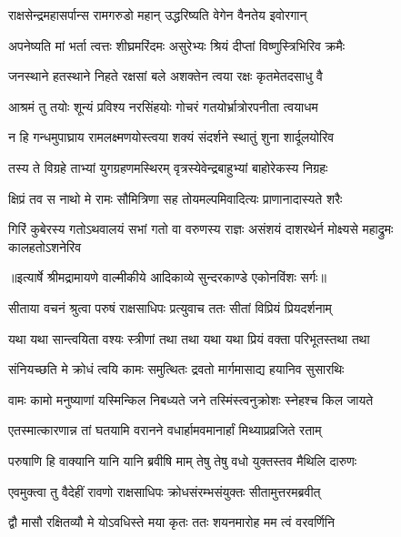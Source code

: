 \twolineshloka
{राक्षसेन्द्रमहासर्पान्स रामगरुडो महान्}
{उद्धरिष्यति वेगेन वैनतेय इवोरगान्} %

\twolineshloka
{अपनेष्यति मां भर्ता त्वत्तः शीघ्रमरिंदमः}
{असुरेभ्यः श्रियं दीप्तां विष्णुस्त्रिभिरिव क्रमैः} %

\twolineshloka
{जनस्थाने हतस्थाने निहते रक्षसां बले}
{अशक्तेन त्वया रक्षः कृतमेतदसाधु वै} %

\twolineshloka
{आश्रमं तु तयोः शून्यं प्रविश्य नरसिंहयोः}
{गोचरं गतयोर्भ्रात्रोरपनीता त्वयाधम} %

\twolineshloka
{न हि गन्धमुपाघ्राय रामलक्ष्मणयोस्त्वया}
{शक्यं संदर्शने स्थातुं शुना शार्दूलयोरिव} %

\twolineshloka
{तस्य ते विग्रहे ताभ्यां युगग्रहणमस्थिरम्}
{वृत्रस्येवेन्द्रबाहुभ्यां बाहोरेकस्य निग्रहः} %

\twolineshloka
{क्षिप्रं तव स नाथो मे रामः सौमित्रिणा सह}
{तोयमल्पमिवादित्यः प्राणानादास्यते शरैः} %

\fourlineindentedshloka
{गिरिं कुबेरस्य गतोऽथवालयं}
{ सभां गतो वा वरुणस्य राज्ञः}
{असंशयं दाशरथेर्न मोक्ष्यसे}
{ महाद्रुमः कालहतोऽशनेरिव} %


{॥इत्यार्षे श्रीमद्रामायणे वाल्मीकीये आदिकाव्ये सुन्दरकाण्डे एकोनविंशः सर्गः॥}


\twolineshloka
{सीताया वचनं श्रुत्वा परुषं राक्षसाधिपः}
{प्रत्युवाच ततः सीतां विप्रियं प्रियदर्शनाम्} %

\twolineshloka
{यथा यथा सान्त्वयिता वश्यः स्त्रीणां तथा तथा}
{यथा यथा प्रियं वक्ता परिभूतस्तथा तथा} %

\twolineshloka
{संनियच्छति मे क्रोधं त्वयि कामः समुत्थितः}
{द्रवतो मार्गमासाद्य हयानिव सुसारथिः} %

\twolineshloka
{वामः कामो मनुष्याणां यस्मिन्किल निबध्यते}
{जने तस्मिंस्त्वनुक्रोशः स्नेहश्च किल जायते} %

\twolineshloka
{एतस्मात्कारणान्न तां घतयामि वरानने}
{वधार्हामवमानार्हां मिथ्याप्रव्रजिते रताम्} %

\twolineshloka
{परुषाणि हि वाक्यानि यानि यानि ब्रवीषि माम्}
{तेषु तेषु वधो युक्तस्तव मैथिलि दारुणः} %

\twolineshloka
{एवमुक्त्वा तु वैदेहीं रावणो राक्षसाधिपः}
{क्रोधसंरम्भसंयुक्तः सीतामुत्तरमब्रवीत्} %

\twolineshloka
{द्वौ मासौ रक्षितव्यौ मे योऽवधिस्ते मया कृतः}
{ततः शयनमारोह मम त्वं वरवर्णिनि} %

